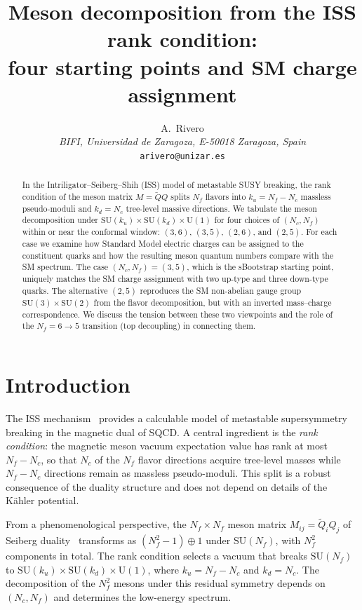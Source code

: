 \documentclass[11pt,a4paper]{article}
\title{Meson decomposition from the ISS rank condition:\\
four starting points and SM charge assignment}
\author{A.~Rivero\\[2pt]
\small\textit{BIFI, Universidad de Zaragoza, E-50018 Zaragoza, Spain}\\
\small\texttt{arivero@unizar.es}}
\date{}
\newcommand{\Nf}{N_{\!f}}
\newcommand{\Nc}{N_{\!c}}
\begin{document}
\maketitle

\begin{abstract}
In the Intriligator--Seiberg--Shih (ISS) model of metastable SUSY
breaking, the rank condition of the meson matrix $M = \tilde Q Q$
splits $\Nf$ flavors into $k_u = \Nf - \Nc$ massless pseudo-moduli
and $k_d = \Nc$ tree-level massive directions.
We tabulate the meson decomposition under
$\mathrm{SU}(k_u)\times\mathrm{SU}(k_d)\times\mathrm{U}(1)$
for four choices of $(\Nc,\Nf)$ within or near the conformal window:
$(3,6)$, $(3,5)$, $(2,6)$, and $(2,5)$.
For each case we examine how Standard Model electric charges can be
assigned to the constituent quarks and how the resulting meson
quantum numbers compare with the SM spectrum.
The case $(\Nc,\Nf)=(3,5)$, which is the sBootstrap starting point,
uniquely matches the SM charge assignment with two up-type and three
down-type quarks.
The alternative $(2,5)$ reproduces the SM non-abelian gauge group
$\mathrm{SU}(3)\times\mathrm{SU}(2)$ from the flavor decomposition,
but with an inverted mass--charge correspondence.
We discuss the tension between these two viewpoints and the role
of the $\Nf=6\to 5$ transition (top decoupling) in connecting them.
\end{abstract}

\section{Introduction}
\label{sec:intro}

The ISS mechanism~\cite{ISS2006} provides a calculable model of
metastable supersymmetry breaking in the magnetic dual of SQCD.
A central ingredient is the \emph{rank condition}: the magnetic
meson vacuum expectation value has rank at most $\Nf - \Nc$, so that
$\Nc$ of the $\Nf$ flavor directions acquire tree-level masses while
$\Nf - \Nc$ directions remain as massless pseudo-moduli.
This split is a robust consequence of the duality structure and
does not depend on details of the K\"ahler potential.

From a phenomenological perspective, the $\Nf\times\Nf$ meson matrix
$M_{ij} = \tilde Q_i Q_j$ of Seiberg duality~\cite{Seiberg1995}
transforms as
$(\Nf^2 - 1) \oplus 1$ under $\mathrm{SU}(\Nf)$, with $\Nf^2$
components in total.
The rank condition selects a vacuum that breaks
$\mathrm{SU}(\Nf)$ to
$\mathrm{SU}(k_u)\times\mathrm{SU}(k_d)\times\mathrm{U}(1)$,
where $k_u = \Nf - \Nc$ and $k_d = \Nc$.
The decomposition of the $\Nf^2$ mesons under this residual symmetry
depends on $(\Nc, \Nf)$ and determines the low-energy spectrum.
\end{document}
